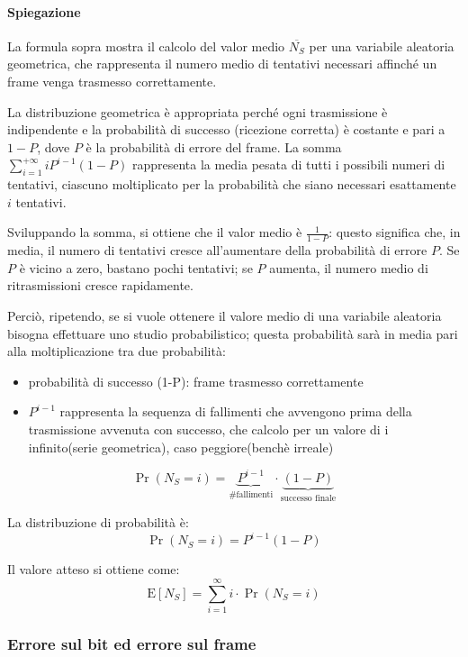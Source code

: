 \paragraph{Spiegazione}
La formula sopra mostra il calcolo del valor medio $\overline{N_S}$ per una variabile aleatoria geometrica, che rappresenta il numero medio di tentativi necessari affinché un frame venga trasmesso correttamente. 

La distribuzione geometrica è appropriata perché ogni trasmissione è indipendente e la probabilità di successo (ricezione corretta) è costante e pari a $1-P$, dove $P$ è la probabilità di errore del frame. La somma $\sum_{i=1}^{+\infty} i P^{i-1}(1-P)$ rappresenta la media pesata di tutti i possibili numeri di tentativi, ciascuno moltiplicato per la probabilità che siano necessari esattamente $i$ tentativi. 

Sviluppando la somma, si ottiene che il valor medio è $\frac{1}{1-P}$: questo significa che, in media, il numero di tentativi cresce all'aumentare della probabilità di errore $P$. Se $P$ è vicino a zero, bastano pochi tentativi; se $P$ aumenta, il numero medio di ritrasmissioni cresce rapidamente.

Perciò, ripetendo, se si vuole ottenere il valore medio di una variabile aleatoria bisogna effettuare uno studio probabilistico; questa probabilità sarà in media pari alla moltiplicazione tra due probabilità:
\begin{itemize}
    \item probabilità di successo (1-P): frame trasmesso correttamente
    \item $P^{i-1}$ rappresenta la sequenza di fallimenti che avvengono prima della trasmissione avvenuta con successo, che calcolo per un valore di i infinito(serie geometrica), caso peggiore(benchè irreale)
\end{itemize}


\[
\Pr(N_S = i) = \underbrace{P^{i-1}}_{\text{\# fallimenti}} \cdot \underbrace{(1 - P)}_{\text{successo finale}}
\]

La distribuzione di probabilità è:
\[
\Pr(N_S = i) = P^{i - 1} (1 - P)
\]

Il valore atteso si ottiene come:
\[
\mathrm{E}[N_S] = \sum_{i = 1}^{\infty} i \cdot \Pr(N_S = i)
\]

\newpage

\subsubsection{Errore sul bit ed errore sul frame}
